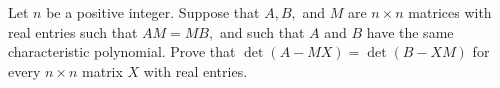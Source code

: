 Let $n$ be a positive integer. Suppose that $A,B,$ and $M$ are $n\times n$ matrices with real entries such that $AM=MB,$ and such that $A$ and $B$ have the same characteristic polynomial. Prove that $\det(A-MX)=\det(B-XM)$ for every $n\times n$ matrix $X$ with real entries.